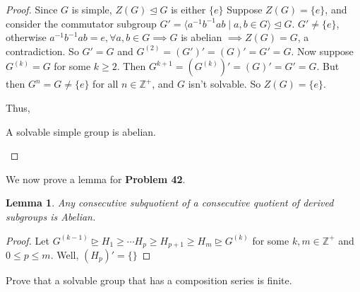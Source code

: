 \documentclass[addpoints,10pt]{exam}
\theoremstyle{plain}
\theoremstyle{definition}
\newtheorem{prob}[thm]{Problem}
\theoremstyle{plain}
\theoremstyle{plain}
\newtheorem{lem}[thm]{Lemma}
\theoremstyle{definition}
\let\oldprob\prob
\let\endoldprob\endprob
\renewenvironment{prob}
  {\begin{singlespace}\oldprob}
  {\endoldprob\end{singlespace}}
\newcommand{\ZZ}{\ensuremath{\mathbb{Z}}}
\begin{document}
\begin{proof}
Since $G$ is simple, $Z(G)\trianglelefteq G$ is either $\{e\}$ Suppose $Z(G)=\{e\}$, and consider the commutator subgroup $G'=\langle a^{-1}b^{-1}ab\mid a,b\in G\rangle\trianglelefteq G$. $G'\neq \{e\}$, otherwise $a^{-1}b^{-1}ab=e,\forall a,b\in G\implies G$ is abelian $\implies Z(G)=G$, a contradiction. So $G'=G$ and $G^{(2)}=(G')'=(G)'=G'=G$. Now suppose $G^{(k)}=G$ for some $k\geq 2$. Then $G^{k+1}=(G^{(k)})'=(G)'=G'=G$. But then $G^{n}=G\neq \{e\}$ for all $n\in \ZZ^{+}$, and $G$ isn't solvable. So $Z(G)=\{e\}$.

Thus,

\begin{center}
  A solvable simple group is abelian.
\end{center}
\end{proof}
We now prove a lemma for \textbf{Problem 42}.
\begin{lem}
  Any consecutive subquotient of a consecutive quotient of derived subgroups is Abelian.
\end{lem}
\begin{proof}
Let $G^{(k-1)}\trianglerighteq  H_{1} \geq \cdots H_{p}\geq H_{p+1}\geq H_{m} \trianglerighteq G^{(k)}$ for some $k,m\in \ZZ^{+}$ and $0\leq p \leq m$. Well, $(H_{p})'=\{\}$  
\end{proof}
\newpage
\begin{prob}
Prove that a solvable group that has a composition series is finite.
\end{prob}
\end{document}

